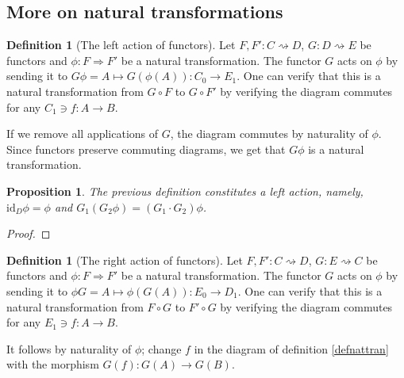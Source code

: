 \documentclass{scrartcl}
\newtheorem{prop}[thm]{Proposition}
\theoremstyle{definition}
\newtheorem{defn}[thm]{Definition}
\theoremstyle{remark}
\newcommand{\id}{\text{id}}
\begin{document}
\subsection{More on natural transformations}
\begin{defn}[The left action of functors]
    Let $F,F':C\rightsquigarrow D$, $G:D\rightsquigarrow E$ be functors and $\phi:F\Rightarrow F'$ be a natural transformation. The functor $G$ acts on $\phi$ by sending it to $G\phi = A \mapsto G(\phi(A)) : C_0 \rightarrow E_1$. One can verify that this is a natural transformation from $G\circ F$ to $G\circ F'$ by verifying the diagram commutes for any $C_1 \ni f:A\rightarrow B$.
    \begin{figure}[h]
        \centering
    \end{figure}
    
    If we remove all applications of $G$, the diagram commutes by naturality of $\phi$. Since functors preserve commuting diagrams, we get that $G\phi$ is a natural transformation.
\end{defn}
\begin{prop}
    The previous definition constitutes a left action, namely, $\id_D\phi = \phi$ and $G_1(G_2\phi)= (G_1 \cdot G_2)\phi$.
\end{prop}
\begin{proof}
    
\end{proof}
\begin{defn}[The right action of functors]
    Let $F,F':C\rightsquigarrow D$, $G:E\rightsquigarrow C$ be functors and $\phi:F\Rightarrow F'$ be a natural transformation. The functor $G$ acts on $\phi$ by sending it to $\phi G = A \mapsto \phi(G(A)) : E_0 \rightarrow D_1$. One can verify that this is a natural transformation from $F\circ G$ to $F'\circ G$ by verifying the diagram commutes for any $E_1 \ni f:A\rightarrow B$.
    \begin{figure}[H]
        \centering
    \end{figure}
    It follows by naturality of $\phi$; change $f$ in the diagram of definition \ref{defnattran} with the morphism $G(f):G(A) \rightarrow G(B)$.
\end{defn}
\end{document}
